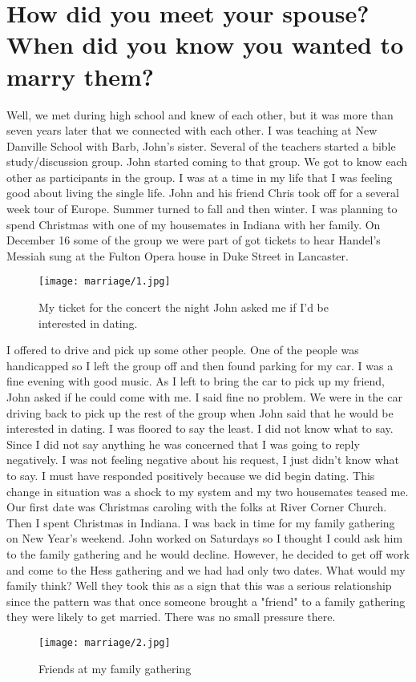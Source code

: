 \section{How did you meet your spouse? When did you know you wanted to marry them?}
Well, we met during high school and knew of each other, but it was more than seven years later that we connected with each other.
I was teaching at New Danville School with Barb, John's sister.
Several of the teachers started a bible study/discussion group.
John started coming to that group.
We got to know each other as participants in the group.
I was at a time in my life that I was feeling good about living the single life.
John and his friend Chris took off for a several week tour of Europe.
Summer turned to fall and then winter.
I was planning to spend Christmas with one of my housemates in Indiana with her family.
On December 16 some of the group we were part of got tickets to hear Handel's Messiah sung at the Fulton Opera house in Duke Street in Lancaster.
\begin{figure}
\centering
\texttt{[image: marriage/1.jpg]}
\caption{
My ticket for the concert the night John asked me if I'd be interested in dating.
}
\end{figure}

I offered to drive and pick up some other people.
One of the people was handicapped so I left the group off and then found parking for my car.
I was a fine evening with good music.
As I left to bring the car to pick up my friend, John asked if he could come with me.
I said fine no problem.
We were in the car driving back to pick up the rest of the group when John said that he would be interested in dating.
I was floored to say the least.
I did not know what to say.
Since I did not say anything he was concerned that I was going to reply negatively.
I was not feeling negative about his request, I just didn't know what to say.
I must have responded positively because we did begin dating.
This change in situation was a shock to my system and my two housemates teased me.
Our first date was Christmas caroling with the folks at River Corner Church.
Then I spent Christmas in Indiana.
I was back in time for my family gathering on New Year's weekend.
John worked on Saturdays so I thought I could ask him to the family gathering and he would decline.
However, he decided to get off work and come to the Hess gathering and we had had only two dates.
What would my family think?
Well they took this as a sign that this was a serious relationship since the pattern was that once someone brought a "friend" to a family gathering they were likely to get married.
There was no small pressure there.
\begin{figure}
\centering
\texttt{[image: marriage/2.jpg]}
\caption{
Friends at my family gathering
}
\end{figure}

